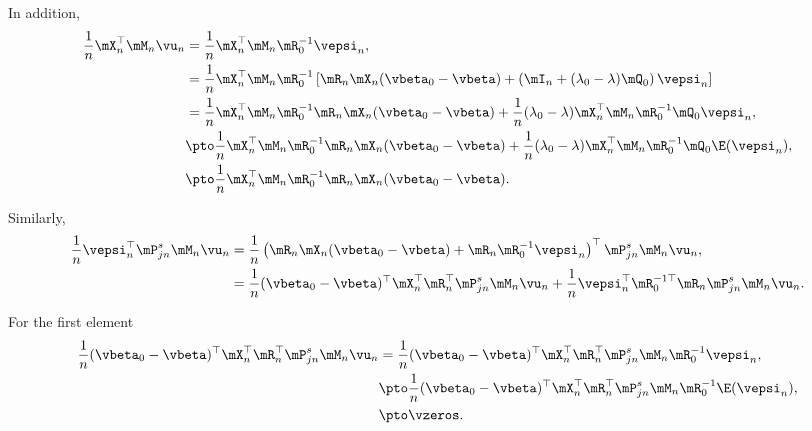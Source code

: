 \begin{subappendices}
In addition, 
\begin{equation*}
\begin{aligned}
  \frac{1}{n}\mX_n^\top\mM_n\vu_n & = \frac{1}{n}\mX_n^\top\mM_n\mR_0^{-1}\vepsi_n, \\
                                  & = \frac{1}{n}\mX_n^\top\mM_n\mR_0^{-1}\left[\mR_n\mX_n(\vbeta_0 - \vbeta) + \left(\mI_n + (\lambda_0 - \lambda)\mQ_0\right)\vepsi_n\right] \\
                                  & = \frac{1}{n}\mX_n^\top\mM_n\mR_0^{-1}\mR_n\mX_n(\vbeta_0 - \vbeta) + \frac{1}{n}(\lambda_0 - \lambda)\mX_n^\top\mM_n\mR_0^{-1}\mQ_0\vepsi_n, \\
                                  & \pto \frac{1}{n}\mX_n^\top\mM_n\mR_0^{-1}\mR_n\mX_n(\vbeta_0 - \vbeta) + \frac{1}{n}(\lambda_0 - \lambda)\mX_n^\top\mM_n\mR_0^{-1}\mQ_0\E(\vepsi_n), \\
                                  & \pto \frac{1}{n}\mX_n^\top\mM_n\mR_0^{-1}\mR_n\mX_n(\vbeta_0 - \vbeta).
\end{aligned}
\end{equation*}

Similarly, 
\begin{equation}
\begin{aligned}
\frac{1}{n}\vepsi_n^\top \mP_{jn}^s\mM_n\vu_n & = \frac{1}{n}\left(\mR_n\mX_n(\vbeta_0 - \vbeta) + \mR_n\mR_0^{-1}\vepsi_n\right)^\top\mP_{jn}^s\mM_n\vu_n, \\
& = \frac{1}{n}(\vbeta_0 - \vbeta)^\top\mX_n^\top\mR_n^\top \mP_{jn}^s\mM_n\vu_n + \frac{1}{n}\vepsi_n^\top\mR_0^{-1\top}\mR_n\mP_{jn}^s\mM_n\vu_n.
\end{aligned}
\end{equation}

For the first element
\begin{equation*}
\begin{aligned}
  \frac{1}{n}(\vbeta_0 - \vbeta)^\top\mX_n^\top\mR_n^\top \mP_{jn}^s\mM_n\vu_n & = \frac{1}{n}(\vbeta_0 - \vbeta)^\top\mX_n^\top\mR_n^\top \mP_{jn}^s\mM_n\mR_0^{-1}\vepsi_n,\\
  & \pto \frac{1}{n}(\vbeta_0 - \vbeta)^\top\mX_n^\top\mR_n^\top \mP_{jn}^s\mM_n\mR_0^{-1}\E(\vepsi_n), \\
  & \pto \vzeros.
  \end{aligned}
\end{equation*}


\end{subappendices}
